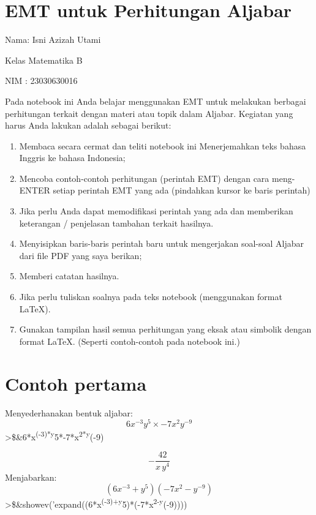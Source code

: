 \documentclass[
]{book}
\author{}
\date{}
\providecommand{\tightlist}{%
  \setlength{\itemsep}{0pt}\setlength{\parskip}{0pt}}
\begin{document}
\frontmatter

\mainmatter
\chapter{EMT untuk Perhitungan Aljabar}\label{emt-untuk-perhitungan-aljabar}

Nama: Isni Azizah Utami

Kelas Matematika B

NIM : 23030630016

Pada notebook ini Anda belajar menggunakan EMT untuk melakukan berbagai perhitungan terkait dengan materi atau topik dalam Aljabar. Kegiatan yang harus Anda lakukan adalah sebagai berikut:

\begin{enumerate}
\def\labelenumi{\arabic{enumi}.}
\tightlist
\item
  Membaca secara cermat dan teliti notebook ini Menerjemahkan teks bahasa Inggris ke bahasa Indonesia;
\item
  Mencoba contoh-contoh perhitungan (perintah EMT) dengan cara meng-ENTER setiap perintah EMT yang ada (pindahkan kursor ke baris perintah)
\item
  Jika perlu Anda dapat memodifikasi perintah yang ada dan memberikan keterangan / penjelasan tambahan terkait hasilnya.
\item
  Menyisipkan baris-baris perintah baru untuk mengerjakan soal-soal Aljabar dari file PDF yang saya berikan;
\item
  Memberi catatan hasilnya.
\item
  Jika perlu tuliskan soalnya pada teks notebook (menggunakan format LaTeX).
\item
  Gunakan tampilan hasil semua perhitungan yang eksak atau simbolik dengan format LaTeX. (Seperti contoh-contoh pada notebook ini.)
\end{enumerate}

\chapter{Contoh pertama}\label{contoh-pertama}

Menyederhanakan bentuk aljabar: \[6x^{-3}y^5\times -7x^2y^{-9}\]\textgreater\$\&6*x\textsuperscript{(-3)*y}5*-7*x\textsuperscript{2*y}(-9)

\[-\frac{42}{x\,y^4}\]Menjabarkan: \[(6x^{-3}+y^5)(-7x^2-y^{-9})\] \textgreater\$\&showev('expand((6*x\textsuperscript{(-3)+y}5)*(-7*x\textsuperscript{2-y}(-9))))
\end{document}
